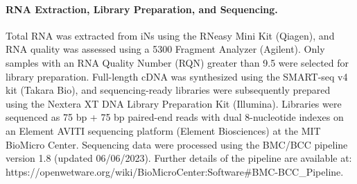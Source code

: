 \paragraph{RNA Extraction, Library Preparation, and Sequencing.}
Total RNA was extracted from iNs using the RNeasy Mini Kit (Qiagen), and RNA quality was assessed using a 5300 Fragment Analyzer (Agilent). Only samples with an RNA Quality Number (RQN) greater than 9.5 were selected for library preparation. Full-length cDNA was synthesized using the SMART-seq v4 kit (Takara Bio), and sequencing-ready libraries were subsequently prepared using the Nextera XT DNA Library Preparation Kit (Illumina). Libraries were sequenced as 75 bp + 75 bp paired-end reads with dual 8-nucleotide indexes on an Element AVITI sequencing platform (Element Biosciences) at the MIT BioMicro Center. Sequencing data were processed using the BMC/BCC pipeline version 1.8 (updated 06/06/2023). Further details of the pipeline are available at: https://openwetware.org/wiki/BioMicroCenter:Software#BMC-BCC_Pipeline.
